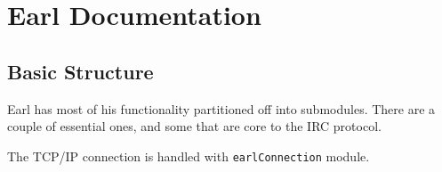 \documentclass[12pt]{article}
\begin{document}
\section*{Earl Documentation}

\subsection*{Basic Structure}

Earl has most of his functionality partitioned off into submodules. There are a
couple of essential ones, and some that are core to the IRC protocol.

The TCP/IP connection is handled with \texttt{earlConnection} module.
\end{document}
